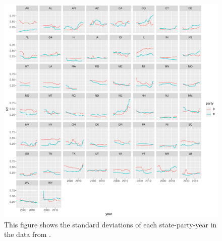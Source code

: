 \documentclass[12pt]{article}
\begin{document}
\begin{figure}[h!]
\begin{center}
\includegraphics[width = \textwidth]{figs/sds.pdf}
\caption{This figure shows the standard deviations of each state-party-year in the data from \cite{shor-2018-data}.}\label{fig:sds}
\end{center}
\end{figure}

\singlespace 


\end{document}
